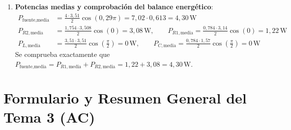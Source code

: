 \begin{ejercicio}
\begin{enumerate}
\begin{align*}
        \mathbf{V}_{R1} &= \mathbf{V}_A - \mathbf{V}_B = (0{,}61 + j 3{,}08)\,\si{\volt} = 3{,}14\angle 78{,}68^\circ\,\si{\volt} \implies v_{R1}(t) = 3{,}14\cos(\omega t + 0{,}437\pi)\,\si{\volt}
    \end{align*}
    \item \textbf{Potencias medias y comprobación del balance energético}:
    \begin{align*}
        P_{\text{fuente,media}} &= \frac{4 \cdot 3{,}51}{2}\cos(0{,}29\pi) = 7{,}02\cdot 0{,}613 = \boxed{4{,}30\,\si{\watt}} \\
        P_{R2,\text{media}} &= \frac{1{,}754 \cdot 3{,}508}{2}\cos(0) = \boxed{3{,}08\,\si{\watt}}, \qquad P_{R1,\text{media}} = \frac{0{,}784 \cdot 3{,}14}{2}\cos(0) = \boxed{1{,}22\,\si{\watt}} \\
        P_{L,\text{media}} &= \frac{3{,}51\cdot 3{,}51}{2}\cos\left(\frac{\pi}{2}\right) = \boxed{0\,\si{\watt}}, \qquad P_{C,\text{media}} = \frac{0{,}784\cdot 1{,}57}{2}\cos\left(\frac{\pi}{2}\right) = \boxed{0\,\si{\watt}}
    \end{align*}
    Se comprueba exactamente que $P_{\text{fuente,media}} = P_{R1,\text{media}} + P_{R2,\text{media}} = 1{,}22 + 3{,}08 = 4{,}30\,\si{\watt}$.
\end{enumerate}
\end{ejercicio}

\section{Formulario y Resumen General del Tema 3 (AC)}

